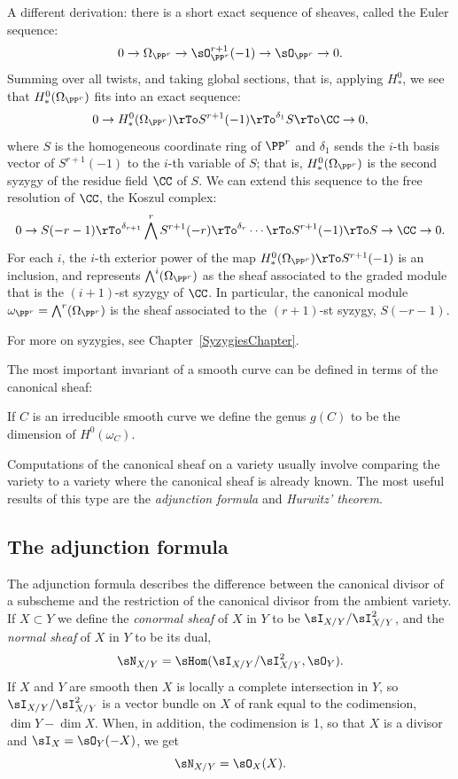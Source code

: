 \begin{fact}
A different derivation: there is a short exact sequence of sheaves, called the Euler sequence:
$$
0\to \Omega_{\PP^{r}} \to \sO_{\PP^{r}}^{r+1} (-1) \to \sO_{\PP^{r}} \to 0.
$$
Summing over all twists, and taking global sections, that is, applying $H^0_*$, we see that 
$H^0_*(\Omega_{\PP^{r}})$ fits into an exact sequence:
$$
0 \to H^0_*(\Omega_{\PP^{r}}) \rTo S^{r+1}(-1) \rTo^{\delta_{1}} S \rTo \CC \to 0,
$$
where $S$ is the homogeneous coordinate ring of $\PP^r$ and $\delta_1$ sends the $i$-th basis vector of
$S^{r+1}(-1)$ to the $i$-th variable of $S$; that is, $H^0_*(\Omega_{\PP^{r}})$ is the second syzygy of the residue field $\CC$ of $S$. We can extend this sequence to  the free resolution
of $\CC$, the Koszul complex:
$$
0 \to S(-r-1) \rTo^{\delta_{r+1}} \bigwedge^rS^{r+1}(-r) \rTo^{\delta_{r}} \cdots \rTo S^{r+1}(-1) \rTo S \to \CC \to 0.
$$
For each $i$, the $i$-th exterior power of the map $H^0_*(\Omega_{\PP^{r}}) \rTo S^{r+1}(-1)$ is an inclusion, and
represents $\bigwedge^i(\Omega_{\PP^{r}})$ as the sheaf associated to the graded module that is the $(i+1)$-st syzygy of $\CC$.
In particular, the canonical module $\omega_{\PP^r} = \bigwedge^r(\Omega_{\PP^{r}})$ is the sheaf associated to the 
$(r+1)$-st syzygy, $S(-r-1)$.

For more on syzygies, see Chapter~\ref{SyzygiesChapter}.
\end{fact}

The most important invariant of a smooth curve can be defined in terms of the canonical sheaf:

\begin{definition}
If $C$ is an irreducible smooth curve we define the genus $g(C)$ to be the dimension of $H^0(\omega_C)$.
\end{definition}

Computations of the canonical sheaf on a variety usually involve comparing the variety to a variety where the canonical sheaf is already known. The most useful results of this type are  the \emph{adjunction formula}
and \emph{Hurwitz' theorem}. 

\subsection{The adjunction formula}\label{Adjunction Formula}

The adjunction formula describes the difference between the canonical divisor of
a  subscheme and the restriction of the canonical divisor from the ambient variety.
If $X\subset Y$ we define the \emph{conormal sheaf} of $X$ in $Y$ to be $\sI_{X/Y}/\sI_{X/Y}^{2}$,
and the \emph{normal sheaf} of $X$ in $Y$ to be its dual, 
$$
\sN_{X/Y} = \sHom(\sI_{X/Y}/\sI_{X/Y}^{2}, \sO_{Y}).
$$
If $X$ and $Y$ are smooth then $X$ is locally a complete intersection in $Y$, so
 $\sI_{X/Y}/\sI_{X/Y}^{2}$ is a vector bundle on $X$ of rank equal to the codimension, $\dim Y -\dim X$.
 When, in addition, the codimension is 1, so that $X$ is a divisor and $\sI_{X} = \sO_{Y}(-X)$, we get
 $$
 \sN_{X/Y} = \sO_{X}(X).
 $$


